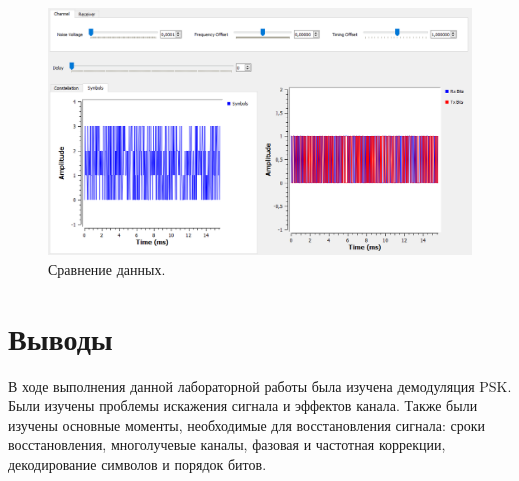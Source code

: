 \documentclass[a4paper, 14pt]{extarticle}
\begin{document}
    \begin{figure}[H]
        \centering
        \includegraphics[width=0.9\linewidth]{resources/Images/task7_compare}
        \caption{Сравнение данных.}
        \label{fig:task7_compare}
    \end{figure}

 \newpage

    \section{Выводы}
    \label{sec:conclusions}

    В ходе выполнения данной лабораторной работы была изучена демодуляция PSK.
    Были изучены проблемы искажения сигнала и эффектов канала.
    Также были изучены основные моменты, необходимые для восстановления сигнала:
    сроки восстановления, многолучевые каналы, фазовая и частотная коррекции, декодирование символов и
    порядок битов.
\end{document}
